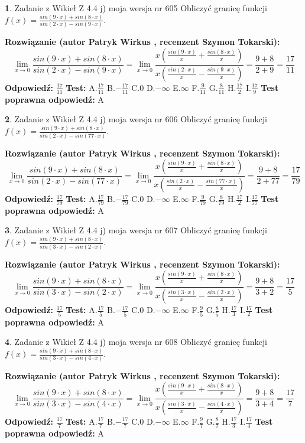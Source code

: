 \documentclass[12pt, a4paper]{article}
\theoremstyle{definition} %
\newtheorem{zad}{}
\newcommand{\zadStart}[1]{\begin{zad}#1\newline}
\newcommand{\zadStop}{\end{zad}}
\newcommand{\rozwStart}[2]{\noindent \textbf{Rozwiązanie (autor #1 , recenzent #2): }\newline}
\newcommand{\rozwStop}{\newline}
\newcommand{\odpStart}{\noindent \textbf{Odpowiedź:}\newline}
\newcommand{\odpStop}{\newline}
\newcommand{\testStart}{\noindent \textbf{Test:}\newline}
\newcommand{\testStop}{\newline}
\newcommand{\kluczStart}{\noindent \textbf{Test poprawna odpowiedź:}\newline}
\newcommand{\kluczStop}{\newline}
\begin{document}
\zadStart{Zadanie z Wikieł Z 4.4 j) moja wersja nr 605}
Obliczyć granicę funkcji $f(x)=\frac{sin(9\cdot x) +sin(8\cdot x)}{sin(2\cdot x) -sin(9\cdot x)}$.
\zadStop
\rozwStart{Patryk Wirkus}{Szymon Tokarski}
$$\lim\limits_{x\to 0}\frac{sin(9\cdot x) +sin(8\cdot x)}{sin(2\cdot x) -sin(9\cdot x)}=\lim\limits_{x\to 0}\frac{x(\frac{sin(9\cdot x)}{x}+\frac{sin(8\cdot x)}{x})}{x(\frac{sin(2\cdot x)}{x}-\frac{sin(9\cdot x)}{x})}=\frac{9+8}{2+9} = \frac{17}{11}$$
\rozwStop
\odpStart
$\frac{17}{11}$
\odpStop
\testStart
A.$\frac{17}{11}$
B.$-\frac{17}{11}$
C.$0$
D.$-\infty$
E.$\infty$
F.$\frac{9}{11}$
G.$\frac{8}{11}$
H.$\frac{17}{2}$
I.$\frac{17}{9}$
\testStop
\kluczStart
A
\kluczStop



\zadStart{Zadanie z Wikieł Z 4.4 j) moja wersja nr 606}
Obliczyć granicę funkcji $f(x)=\frac{sin(9\cdot x) +sin(8\cdot x)}{sin(2\cdot x) -sin(77\cdot x)}$.
\zadStop
\rozwStart{Patryk Wirkus}{Szymon Tokarski}
$$\lim\limits_{x\to 0}\frac{sin(9\cdot x) +sin(8\cdot x)}{sin(2\cdot x) -sin(77\cdot x)}=\lim\limits_{x\to 0}\frac{x(\frac{sin(9\cdot x)}{x}+\frac{sin(8\cdot x)}{x})}{x(\frac{sin(2\cdot x)}{x}-\frac{sin(77\cdot x)}{x})}=\frac{9+8}{2+77} = \frac{17}{79}$$
\rozwStop
\odpStart
$\frac{17}{79}$
\odpStop
\testStart
A.$\frac{17}{79}$
B.$-\frac{17}{79}$
C.$0$
D.$-\infty$
E.$\infty$
F.$\frac{9}{79}$
G.$\frac{8}{79}$
H.$\frac{17}{2}$
I.$\frac{17}{77}$
\testStop
\kluczStart
A
\kluczStop



\zadStart{Zadanie z Wikieł Z 4.4 j) moja wersja nr 607}
Obliczyć granicę funkcji $f(x)=\frac{sin(9\cdot x) +sin(8\cdot x)}{sin(3\cdot x) -sin(2\cdot x)}$.
\zadStop
\rozwStart{Patryk Wirkus}{Szymon Tokarski}
$$\lim\limits_{x\to 0}\frac{sin(9\cdot x) +sin(8\cdot x)}{sin(3\cdot x) -sin(2\cdot x)}=\lim\limits_{x\to 0}\frac{x(\frac{sin(9\cdot x)}{x}+\frac{sin(8\cdot x)}{x})}{x(\frac{sin(3\cdot x)}{x}-\frac{sin(2\cdot x)}{x})}=\frac{9+8}{3+2} = \frac{17}{5}$$
\rozwStop
\odpStart
$\frac{17}{5}$
\odpStop
\testStart
A.$\frac{17}{5}$
B.$-\frac{17}{5}$
C.$0$
D.$-\infty$
E.$\infty$
F.$\frac{9}{5}$
G.$\frac{8}{5}$
H.$\frac{17}{3}$
I.$\frac{17}{2}$
\testStop
\kluczStart
A
\kluczStop



\zadStart{Zadanie z Wikieł Z 4.4 j) moja wersja nr 608}
Obliczyć granicę funkcji $f(x)=\frac{sin(9\cdot x) +sin(8\cdot x)}{sin(3\cdot x) -sin(4\cdot x)}$.
\zadStop
\rozwStart{Patryk Wirkus}{Szymon Tokarski}
$$\lim\limits_{x\to 0}\frac{sin(9\cdot x) +sin(8\cdot x)}{sin(3\cdot x) -sin(4\cdot x)}=\lim\limits_{x\to 0}\frac{x(\frac{sin(9\cdot x)}{x}+\frac{sin(8\cdot x)}{x})}{x(\frac{sin(3\cdot x)}{x}-\frac{sin(4\cdot x)}{x})}=\frac{9+8}{3+4} = \frac{17}{7}$$
\rozwStop
\odpStart
$\frac{17}{7}$
\odpStop
\testStart
A.$\frac{17}{7}$
B.$-\frac{17}{7}$
C.$0$
D.$-\infty$
E.$\infty$
F.$\frac{9}{7}$
G.$\frac{8}{7}$
H.$\frac{17}{3}$
I.$\frac{17}{4}$
\testStop
\kluczStart
A
\kluczStop
\end{document}
